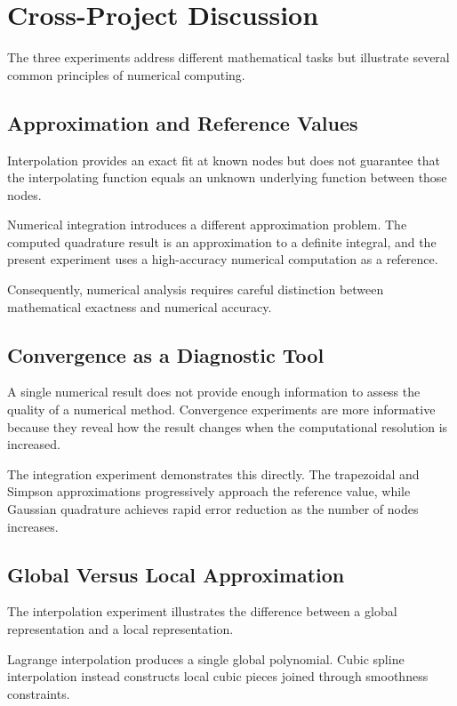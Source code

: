 \documentclass[11pt,a4paper]{article}
\begin{document}
\newpage

\section{Cross-Project Discussion}

The three experiments address different mathematical tasks but illustrate
several common principles of numerical computing.

\subsection{Approximation and Reference Values}

Interpolation provides an exact fit at known nodes but does not guarantee
that the interpolating function equals an unknown underlying function
between those nodes.

Numerical integration introduces a different approximation problem. The
computed quadrature result is an approximation to a definite integral, and
the present experiment uses a high-accuracy numerical computation as a
reference.

Consequently, numerical analysis requires careful distinction between
mathematical exactness and numerical accuracy.

\subsection{Convergence as a Diagnostic Tool}

A single numerical result does not provide enough information to assess the
quality of a numerical method. Convergence experiments are more informative
because they reveal how the result changes when the computational
resolution is increased.

The integration experiment demonstrates this directly. The trapezoidal
and Simpson approximations progressively approach the reference value,
while Gaussian quadrature achieves rapid error reduction as the number of
nodes increases.

\subsection{Global Versus Local Approximation}

The interpolation experiment illustrates the difference between a global
representation and a local representation.

Lagrange interpolation produces a single global polynomial. Cubic spline
interpolation instead constructs local cubic pieces joined through
smoothness constraints.
\end{document}
